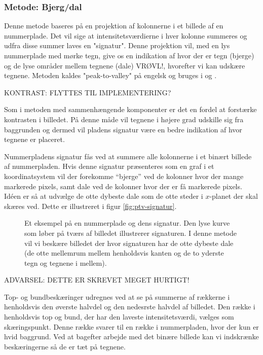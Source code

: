 \subsubsection*{Metode: Bjerg/dal}

Denne metode baseres på en projektion af kolonnerne i et billede af en nummerplade. Det vil sige at intensitetsværdierne i hver kolonne summeres og udfra disse summer laves en "signatur". Denne projektion vil, med en lys nummerplade med mørke tegn, give os en indikation af hvor der er tegn (bjerge) og de lyse områder mellem tegnene (dale) VRØVL!, hvorefter vi kan udskære tegnene. Metoden kaldes "peak-to-valley" på engelsk og bruges i \cite{ron} og \cite{kwas}.

KONTRAST: FLYTTES TIL IMPLEMENTERING?

Som i metoden med sammenhængende komponenter er det en fordel at forstærke kontrasten i billedet. På denne måde vil tegnene i højere grad udskille sig fra baggrunden og dermed vil pladens signatur være en bedre indikation af hvor tegnene er placeret.

Nummerpladens signatur fås ved at summere alle kolonnerne i et binært billede af nummerpladen. Hvis denne signatur præsenteres som en graf i et koordinatsystem vil der forekomme ``bjerge'' ved de kolonner hvor der mange markerede pixels, samt dale ved de kolonner hvor der er få markerede pixels. Idéen er så at udvælge de otte dybeste dale som de otte steder i $x$-planet der skal skæres ved. Dette er illustreret i figur \vref{fig:ptv-signatur}.

\begin{figure}[htp]
  \centering
  \caption{Et eksempel på en nummerplade og dens signatur. Den lyse kurve som løber på tværs af billedet illustrerer signaturen. I denne metode vil vi beskære billedet der hvor signaturen har de otte dybeste dale (de otte mellemrum mellem henholdsvis kanten og de to yderste tegn og tegnene i mellem).}
  \label{fig:ptv-signatur}
\end{figure}

ADVARSEL: DETTE ER SKREVET MEGET HURTIGT!

Top- og bundbeskæringer udregnes ved at se på summerne af rækkerne i henholdsvis den øverste halvdel og den nedesrste halvdel af billedet. Den række i henholdsvis top og bund, der har den laveste intensitetsværdi, vælges som skæringspunkt. Denne række svarer til en række i nummerpladen, hvor der kun er hvid baggrund. Ved at bagefter arbejde med det binære billede kan vi indskrænke beskæringerne så de er tæt på tegnene.

